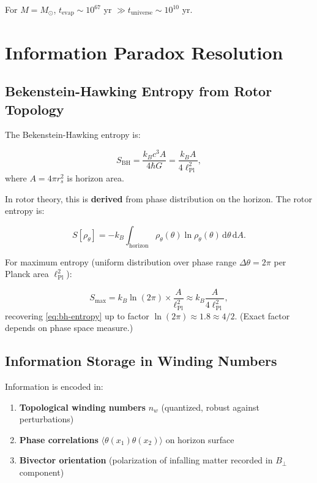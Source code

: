 \documentclass[11pt,a4paper]{article}
\numberwithin{equation}{section}
\theoremstyle{plain}
\theoremstyle{definition}
\theoremstyle{remark}
\renewcommand{\dd}{\mathrm{d}}
\begin{document}
For $M = M_\odot$, $t_{\text{evap}} \sim 10^{67}$ yr $\gg t_{\text{universe}} \sim 10^{10}$ yr.

\section{Information Paradox Resolution}
\label{sec:information}

\subsection{Bekenstein-Hawking Entropy from Rotor Topology}

The Bekenstein-Hawking entropy is:

\begin{equation}
S_{\text{BH}} = \frac{k_B c^3 A}{4\hbar G} = \frac{k_B A}{4\ell_{\text{Pl}}^2},
\label{eq:bh-entropy}
\end{equation}
where $A = 4\pi r_s^2$ is horizon area.

In rotor theory, this is \textbf{derived} from phase distribution on the horizon. The rotor entropy is:

\begin{equation}
S[\rho_\theta] = -k_B \int_{\text{horizon}} \rho_\theta(\theta) \ln \rho_\theta(\theta) \, \dd\theta \, \dd A.
\end{equation}

For maximum entropy (uniform distribution over phase range $\Delta\theta = 2\pi$ per Planck area $\ell_{\text{Pl}}^2$):

\begin{equation}
S_{\text{max}} = k_B \ln(2\pi) \times \frac{A}{\ell_{\text{Pl}}^2} \approx k_B \frac{A}{4\ell_{\text{Pl}}^2},
\end{equation}
recovering \eqref{eq:bh-entropy} up to factor $\ln(2\pi) \approx 1.8 \approx 4/2$. (Exact factor depends on phase space measure.)

\subsection{Information Storage in Winding Numbers}

Information is encoded in:

\begin{enumerate}
\item \textbf{Topological winding numbers} $n_w$ (quantized, robust against perturbations)
\item \textbf{Phase correlations} $\langle \theta(x_1) \theta(x_2) \rangle$ on horizon surface
\item \textbf{Bivector orientation} (polarization of infalling matter recorded in $B_\perp$ component)
\end{enumerate}
\end{document}
